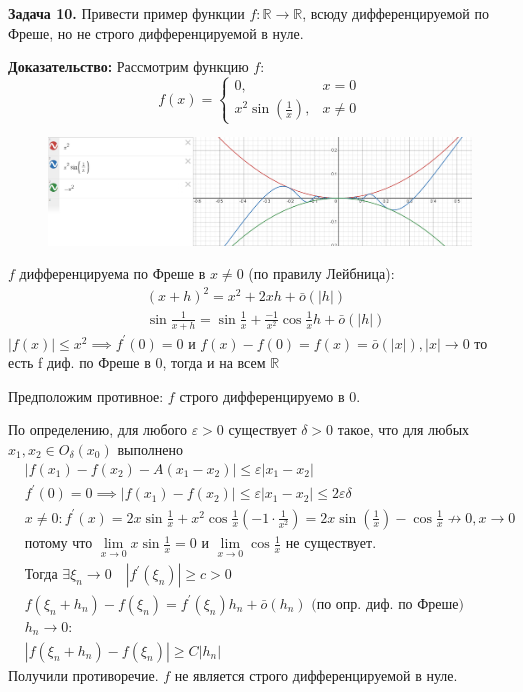 \begin{task}
\textbf{Задача 10. }Привести пример функции $f: \mathbb{R} \rightarrow \mathbb{R}$, всюду дифференцируемой по Фреше, но не строго дифференцируемой в нуле.

\textbf{Доказательство:}
Рассмотрим функцию $f$:
\[
f(x)= \begin{cases}0, & x=0 \\ x^2 \sin \left(\frac{1}{x}\right), & x \neq 0\end{cases} 
\]

\begin{figure}[h!]
\centering
\includegraphics[width=0.99\linewidth]{image.png}
\end{figure}
 
$f$ дифференцируема по Фреше в $x \neq 0$ (по правилу Лейбница):
\[\begin{aligned}
&(x+h)^2 = x^2 +2xh+ \bar{o}(|h|)\\
& \sin{\frac{1}{x+h}} = \sin{\frac{1}{x}} + \frac{-1}{x^2} \cos{\frac{1}{x}}h + \bar{o}(|h|)
\end{aligned}\]
$|f(x)| \leq x^2 \implies f^{\prime}(0)=0$ и $f(x)-f(0)=f(x) =\bar{o}(|x|), |x| \rightarrow 0 $
то есть f диф. по Фреше в 0, тогда и на всем $\mathbb{R}$

Предположим противное: $f$ строго дифференцируемо в $0$.

По определению,  для любого $\varepsilon>0$ существует $\delta>0$ такое, что для любых $x_1, x_2 \in O_\delta\left(x_0\right)$ выполнено
\[\begin{aligned}
&|f\left(x_1\right)-f\left(x_2\right)-A\left(x_1-x_2\right)|\leq \varepsilon|x_1-x_2| \\
&f^{\prime}(0)=0 \implies |f\left(x_1\right)-f\left(x_2\right)|\leq \varepsilon|x_1-x_2|\leq 2\varepsilon \delta \\
& x\neq 0:  f^{\prime}(x)=2 x \sin \frac{1}{x}+x^2 \cos \frac{1}{x}\left(-1 \cdot \frac{1}{x^2}\right)=2 x \sin \left(\frac{1}{x}\right)-\cos \frac{1}{x} \nrightarrow 0, x \rightarrow 0 \\
& \text{потому что } \lim _{x \rightarrow 0} x \sin \frac{1}{x}=0 \text{ и } \lim _{x \rightarrow 0} \cos \frac{1}{x} \text{ не существует.} \\
& \text{Тогда }\exists \xi_n \rightarrow 0 \quad\left|f^{\prime}\left(\xi_n\right)\right| \geqslant c>0 \\
& f\left(\xi_n+h_n\right)-f\left(\xi_n\right)=f^{\prime}\left(\xi_n\right) h_n+\bar{o}\left(h_n\right) \text{ (по опр. диф. по Фреше)}\\
& h_n \longrightarrow 0 :\\
& \left|f\left(\xi_n+h_n\right)-f\left(\xi_n\right)\right| \geqslant C\left|h_n\right|
\end{aligned}\]
Получили противоречие. $f$ не является строго дифференцируемой в нуле.
\end{task}
